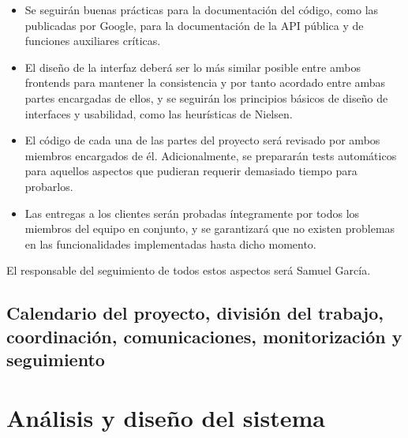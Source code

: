 \documentclass[11pt, a4paper, titlepage]{article}
\begin{document}
\begin{itemize}
    \item Se seguirán buenas prácticas para la documentación del código, como las publicadas por Google\textsuperscript{\cite{documentaciongoogle}}, para la documentación de la API pública y de funciones auxiliares críticas.
    
    \item El diseño de la interfaz deberá ser lo más similar posible entre ambos frontends para mantener la consistencia y por tanto acordado entre ambas partes encargadas de ellos, y se seguirán los principios básicos de diseño de interfaces y usabilidad, como las heurísticas de Nielsen\textsuperscript{\cite{heuristicasnielsen}}.
    
    \item El código de cada una de las partes del proyecto será revisado por ambos miembros encargados de él. Adicionalmente, se prepararán tests automáticos para aquellos aspectos que pudieran requerir demasiado tiempo para probarlos.
    
    \item Las entregas a los clientes serán probadas íntegramente por todos los miembros del equipo en conjunto, y se garantizará que no existen problemas en las funcionalidades implementadas hasta dicho momento.
\end{itemize}

El responsable del seguimiento de todos estos aspectos será Samuel García.



\subsection{Calendario del proyecto, división del trabajo, coordinación, comunicaciones, monitorización y seguimiento}

\section{Análisis y diseño del sistema}
\end{document}
